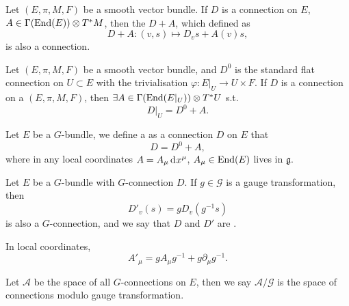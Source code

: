 \documentclass[openany, oneside, a5paper]{book}
\begin{document}
\begin{theorem}
    Let $(E, \pi, M, F)$ be a smooth vector bundle.
    If $D$ is a connection on $E$, $A \in \Gamma(\operatorname{End}(E)) \otimes T^*M$, then
    the $D + A$, which defined as
    \begin{equation}
        D + A \colon (v, s)  \mapsto D_v s + A(v) s,
    \end{equation}
    is also a connection.
\end{theorem}

\begin{theorem}
    Let $(E, \pi, M, F)$ be a smooth vector bundle, and $D^0$ is the standard flat connection on $U \subset E$ with the trivialisation $\varphi \colon E|_U \to U \times F$.
    If $D$ is a connection on a $(E, \pi, M, F)$,
    then $\exists A \in \Gamma(\operatorname{End}(E|_U)) \otimes T^*U$ s.t.\ 
    \begin{equation}
        D|_U = D^0 + A.
    \end{equation}
\end{theorem}

\begin{definition}[$G$-connection]
    Let $E$ be a $G$-bundle, we define a  as a connection $D$ on $E$ that
    \begin{equation}
        D = D^0 + A,
    \end{equation}
    where in any local coordinates $A = A_\mu \mathop{}\!\mathrm{d}^{} x^\mu$, $A_\mu \in \operatorname{End}(E)$ lives in $\mathfrak g$.
\end{definition}

\begin{definition}
    Let $E$ be a $G$-bundle with $G$-connection $D$. 
    If $g \in \mathcal G$ is a gauge transformation, then
    \begin{equation}
        D'_v (s) = g D_v(g^{-1}s) 
    \end{equation}
    is also a $G$-connection, and we say that $D$ and $D'$ are .
\end{definition}

In local coordinates, 
\begin{equation}
    A'_\mu = g A_\mu g^{-1} + g \partial_\mu g^{-1}.
\end{equation}

Let $\mathcal A$ be the space of all $G$-connections on $E$, then we say $\mathcal A / \mathcal G$ is the space of connections modulo gauge transformation.
\end{document}
